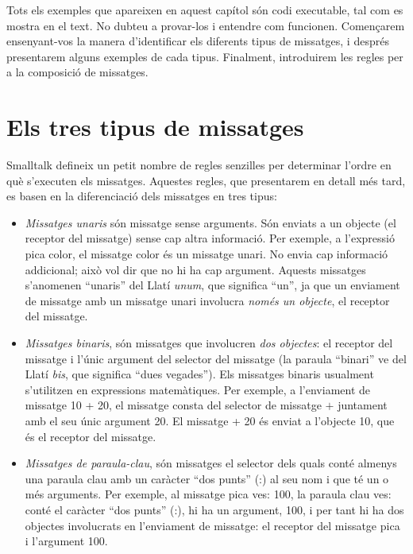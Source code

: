 Tots els exemples que apareixen en aquest capítol són codi executable, tal com es mostra en el text. No dubteu a provar-los i entendre com funcionen. Començarem ensenyant-vos la manera d'identificar els diferents tipus de missatges, i després presentarem alguns exemples de cada tipus. Finalment, introduirem les regles per a la composició de missatges.

\section{Els tres tipus de missatges}

Smalltalk defineix un petit nombre de regles senzilles per determinar l'ordre en què s'executen els missatges. Aquestes regles, que presentarem en detall més tard, es basen en la diferenciació dels missatges en tres tipus:

\begin{itemize}
\item \emph{Missatges unaris} són missatge sense arguments. Són enviats a un objecte (el receptor del missatge) sense cap altra informació. Per exemple, a l'expressió \textsf{pica color}, el missatge \textsf{color} és un missatge unari. No envia cap informació addicional; això vol dir que no hi ha cap argument. Aquests missatges s'anomenen ``unaris'' del Llatí \emph{unum}, que significa ``un'', ja que un enviament de missatge amb un missatge unari involucra \emph{només un objecte}, el receptor del missatge.
\item \emph{Missatges binaris}, són missatges que involucren \emph{dos objectes}: el receptor del missatge i l'únic argument del selector del missatge (la paraula ``binari'' ve del Llatí \emph{bis}, que significa ``dues vegades''). Els missatges binaris usualment s'utilitzen en expressions matemàtiques. Per exemple, a l'enviament de missatge \textsf{10 + 20}, el missatge consta del selector de missatge \textsf{$+$} juntament amb el seu únic argument \textsf{20}. El missatge \textsf{+ 20} és enviat a l'objecte \textsf{10}, que és el receptor del missatge. 
\item \emph{Missatges de paraula-clau}, són missatges el selector dels quals conté almenys una paraula clau amb un caràcter ``dos punts'' (:) al seu nom i que té un o més arguments. Per exemple, al missatge \textsf{pica ves: 100}, la paraula clau \textsf{ves:} conté el caràcter ``dos punts'' (:), hi ha un argument, \textsf{100}, i per tant hi ha dos objectes involucrats en l'enviament de missatge: el receptor del missatge \textsf{pica} i l'argument \textsf{100}.
\end{itemize}

